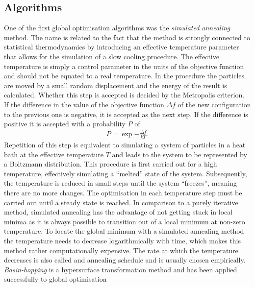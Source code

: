 \subsection{Algorithms}
\label{sec:GOAlgorithms}

One of the first global optimisation algorithms was the \textit{simulated
annealing} method.\autocite{Kirkpatrick_OptimizationSimulatedAnnealing_1983} The
name is related to the fact that the method is strongly connected to statistical
thermodynamics by introducing an effective temperature parameter that allows for
the simulation of a slow cooling procedure. The effective temperature is simply
a control parameter in the units of the objective function and should not be
equated to a real temperature. In the procedure the particles are moved by a
small random displacement and the energy of the result is calculated. Whether
this step is accepted is decided by the Metropolis
criterion.\autocite{Metropolis_EquationStateCalculations_1953} If the difference
in the value of the objective function $\Delta f$ of the new configuration to
the previous one is negative, it is accepted as the next step. If the difference
is positive it is accepted with a probability $P$ of
%
\begin{align}
    P = \exp{-\frac{\Delta f}{kT}}.
\end{align}
%
Repetition of this step is equivalent to simulating a system of particles in a
heat bath at the effective temperature $T$ and leads to the system to be
represented by a Boltzmann distribution. This procedure is first carried out for
a high temperature, effectively simulating a ``melted'' state of the system.
Subsequently, the temperature is reduced in small steps until the system
``freezes'', meaning there are no more changes. The optimisation in each
temperature step must be carried out until a steady state is reached. In
comparison to a purely iterative method, simulated annealing has the advantage
of not getting stuck in local minima as it is always possible to transition out
of a local minimum at non-zero temperature. To locate the global minimum with a
simulated annealing method the temperature needs to decrease logarithmically
with time, which makes this method rather computationally expensive. The rate at
which the temperature decreases is also called and annealing schedule and is
usually chosen empirically.
%
\\\newline
\textit{Basin-hopping} is a hypersurface transformation method and has been
applied successfully to global optimisation
